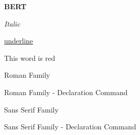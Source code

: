 \documentclass[a4paper] {report}
\begin{document}
\textbf {BERT} 	\par		%

\emph {Italic}	\par		%

\underline {underline} \par	%

{\color {red} This word is red } \par

\textrm{Roman Family} \par
{\rmfamily Roman Family - Declaration Command} \par

\textsf{Sans Serif Family} \par
{\sffamily Sans Serif Family - Declaration Command} \par
\end{document}
